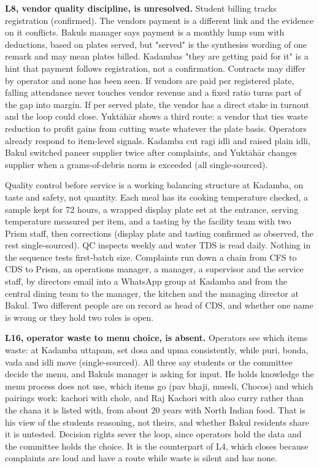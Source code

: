 \documentclass[
  10pt,
  table]{article}
\newcounter{none} %
\begin{document}
\textbf{L8, vendor quality discipline, is unresolved.} Student billing tracks registration (confirmed). The vendor\textquotesingle s payment is a different link and the evidence on it conflicts. Bakul\textquotesingle s manager says payment is a monthly lump sum with deductions, based on plates served, but "served" is the synthesis\textquotesingle s wording of one remark and may mean plates billed. Kadamba\textquotesingle s "they are getting paid for it" is a hint that payment follows registration, not a confirmation. Contracts may differ by operator and none has been seen. If vendors are paid per registered plate, falling attendance never touches vendor revenue and a fixed ratio turns part of the gap into margin. If per served plate, the vendor has a direct stake in turnout and the loop could close. Yuktāhār shows a third route: a vendor that ties waste reduction to profit gains from cutting waste whatever the plate basis. Operators already respond to item-level signals. Kadamba cut ragi idli and raised plain idli, Bakul switched paneer supplier twice after complaints, and Yuktāhār changes supplier when a grams-of-debris norm is exceeded (all single-sourced).

Quality control before service is a working balancing structure at Kadamba, on taste and safety, not quantity. Each meal has its cooking temperature checked, a sample kept for 72 hours, a wrapped display plate set at the entrance, serving temperature measured per item, and a tasting by the facility team with two Prism staff, then corrections (display plate and tasting confirmed as observed, the rest single-sourced). QC inspects weekly and water TDS is read daily. Nothing in the sequence tests first-batch size. Complaints run down a chain from CFS to CDS to Prism, an operations manager, a manager, a supervisor and the service staff, by director\textquotesingle s email into a WhatsApp group at Kadamba and from the central dining team to the manager, the kitchen and the managing director at Bakul. Two different people are on record as head of CDS, and whether one name is wrong or they hold two roles is open.

\textbf{L16, operator waste to menu choice, is absent.} Operators see which items waste: at Kadamba uttapam, set dosa and upma consistently, while puri, bonda, vada and idli move (single-sourced). All three say students or the committee decide the menu, and Bakul\textquotesingle s manager is asking for input. He holds knowledge the menu process does not use, which items go (pav bhaji, muesli, Chocos) and which pairings work: kachori with chole, and Raj Kachori with aloo curry rather than the chana it is listed with, from about 20 years with North Indian food. That is his view of the students\textquotesingle{} reasoning, not theirs, and whether Bakul residents share it is untested. Decision rights sever the loop, since operators hold the data and the committee holds the choice. It is the counterpart of L4, which closes because complaints are loud and have a route while waste is silent and has none.
\end{document}
